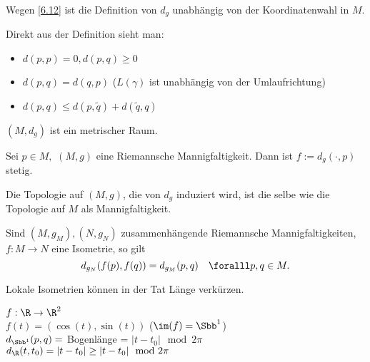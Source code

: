 \lecture\begin{rem}
	Wegen \ref{6.12} ist die Definition von $d_g$ unabhängig von der Koordinatenwahl in $M$.
\end{rem}

\begin{rem}
	Direkt aus der Definition sieht man:
	\begin{itemize}
		\item $ d(p,p) = 0, d(p,q) \geq 0 $
		\item $ d(p,q) = d(q,p) $ ($L(\gamma)$ ist unabhängig von der Umlaufrichtung)
		\item $ d(p,q) \leq d(p,\tilde{q}) + d(\tilde{q},q) $
	\end{itemize}
\end{rem}

\begin{thm}
	$ (M,d_g) $ ist ein metrischer Raum.
\end{thm}

\begin{lem}
	Sei $ p \in M,$ $(M,g) $ eine Riemannsche Mannigfaltigkeit. Dann ist $ f:= d_g(\cdot,p) $ stetig.
\end{lem}

\begin{cor}
	Die Topologie auf $ (M,g) $, die von $d_g$ induziert wird, ist die selbe wie die Topologie auf $M$ als Mannigfaltigkeit.
\end{cor}

\begin{lem}
	Sind $ (M,g_M), (N,g_N) $ zusammenhängende Riemannsche Mannigfaltigkeiten, $ f:M \to N $ eine Isometrie, so gilt
	\[ d_{g_N}(f(p),f(q)) = d_{g_M}(p,q) \quad \foralll p,q \in M. \]
\end{lem}

\begin{rem*}
	Lokale Isometrien können in der Tat Länge verkürzen.\\
	\begin{minipage}{\linewidth}
		\begin{wrapfigure}{r}{4cm}
		\end{wrapfigure}
		$ f: \R \to \R^2$\\
		$f(t) = (\cos(t),\sin(t)) $ ($ \im(f) = \Sbb^1 $)\\
		$ d_{\Sbb^1}(p,q) = $ Bogenlänge = $ |t-t_0| \mod 2\pi $\\
		$ d_\R(t,t_0) = |t-t_0| \geq |t-t_0| \mod 2\pi $
	\end{minipage}
\end{rem*}

